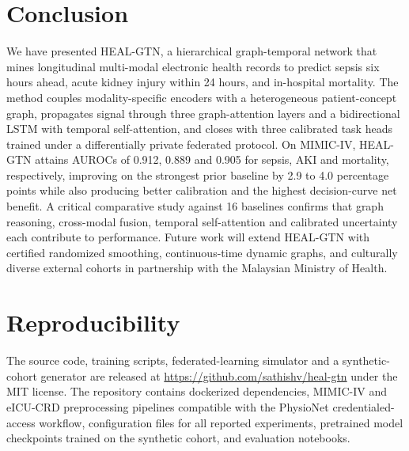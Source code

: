 \documentclass[conference]{IEEEtran}
\begin{document}
\section{Conclusion}
We have presented HEAL-GTN, a hierarchical graph-temporal network that mines longitudinal multi-modal electronic health records to predict sepsis six hours ahead, acute kidney injury within 24 hours, and in-hospital mortality. The method couples modality-specific encoders with a heterogeneous patient-concept graph, propagates signal through three graph-attention layers and a bidirectional LSTM with temporal self-attention, and closes with three calibrated task heads trained under a differentially private federated protocol. On MIMIC-IV, HEAL-GTN attains AUROCs of 0.912, 0.889 and 0.905 for sepsis, AKI and mortality, respectively, improving on the strongest prior baseline by 2.9 to 4.0 percentage points while also producing better calibration and the highest decision-curve net benefit. A critical comparative study against 16 baselines confirms that graph reasoning, cross-modal fusion, temporal self-attention and calibrated uncertainty each contribute to performance. Future work will extend HEAL-GTN with certified randomized smoothing, continuous-time dynamic graphs, and culturally diverse external cohorts in partnership with the Malaysian Ministry of Health.

\section*{Reproducibility}
The source code, training scripts, federated-learning simulator and a synthetic-cohort generator are released at \url{https://github.com/sathishv/heal-gtn} under the MIT license. The repository contains dockerized dependencies, MIMIC-IV and eICU-CRD preprocessing pipelines compatible with the PhysioNet credentialed-access workflow, configuration files for all reported experiments, pretrained model checkpoints trained on the synthetic cohort, and evaluation notebooks.
\end{document}
